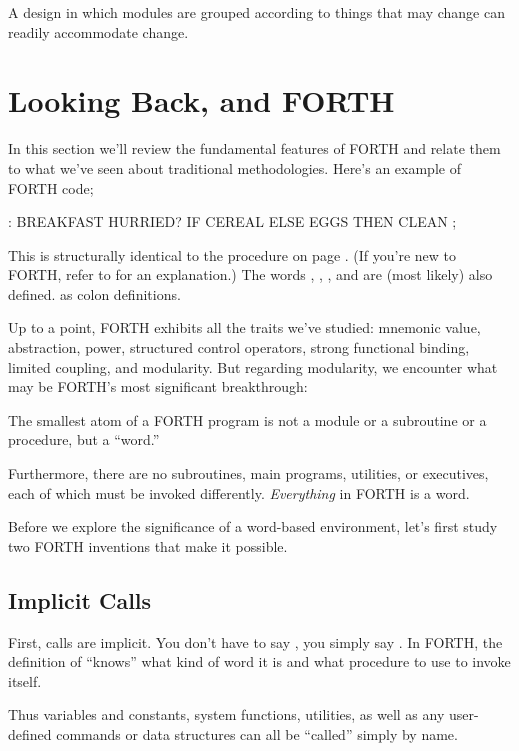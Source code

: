 A design in which modules are grouped according to things that may
change can readily accommodate change.


\section{Looking Back, and FORTH}
In this section we'll review the fundamental features of FORTH and
relate them to what we've seen about traditional methodologies. Here's
an example of FORTH code;

\begin{Code}
: BREAKFAST
   HURRIED?  IF  CEREAL  ELSE  EGGS  THEN CLEAN ;
\end{Code}
This is structurally identical to the procedure  on
page \pageref{make-breakfast}. (If you're new to FORTH, refer to
 for an explanation.)  The words ,
, , and  are (most likely) also
defined. as colon definitions.

Up to a point, FORTH exhibits all the traits we've studied: mnemonic
value, abstraction, power, structured control operators, strong
functional binding, limited coupling, and modularity. But regarding
modularity, we encounter what may be FORTH's most significant
breakthrough:

\begin{tfquot}
The smallest atom of a FORTH program is not a module or a subroutine
or a procedure, but a ``word.''
\end{tfquot}
Furthermore, there are no subroutines, main programs, utilities, or
executives, each of which must be invoked differently.
\emph{Everything} in FORTH is a word.

Before we explore the significance of a word-based environment, let's
first study two FORTH inventions that make it possible.


\subsection{Implicit Calls}
First, calls are implicit. You don't have to say ,
you simply say . In FORTH, the definition of
 ``knows'' what kind of word it is and what procedure to
use to invoke itself.

Thus variables and constants, system functions, utilities, as well
as any user-defined commands or data structures can all be ``called''
simply by name.


